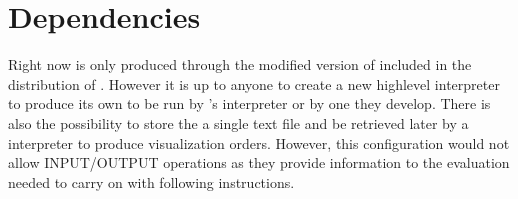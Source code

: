 \section{Dependencies}
\label{sec:dependencies}

Right now \mcode{} is only produced through the modified version of \djava{} included in the distribution of \jel{}. However it is up to anyone to create a new high\-{}level interpreter to produce its own \mcode{} to be run by \jel{}'s \mcode{} interpreter or by one they develop. 
There is also the possibility to store the \mcode{} a single text file and be retrieved later by a \mcode{} interpreter to produce visualization orders. However, this configuration would not allow INPUT/OUTPUT operations as they provide information to the evaluation needed to carry on with following instructions. 